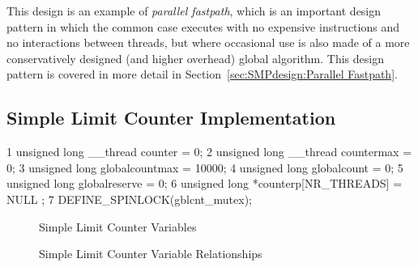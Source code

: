 This design is an example of \emph{parallel fastpath}, which is an important
design pattern in which the common case executes with no expensive
instructions and no interactions between threads, but where occasional
use is also made of a more conservatively designed
(and higher overhead) global algorithm.
This design pattern is covered in more detail in
Section~\ref{sec:SMPdesign:Parallel Fastpath}.

\subsection{Simple Limit Counter Implementation}
\label{sec:count:Simple Limit Counter Implementation}

{ \scriptsize
\begin{verbbox}
  1 unsigned long __thread counter = 0;
  2 unsigned long __thread countermax = 0;
  3 unsigned long globalcountmax = 10000;
  4 unsigned long globalcount = 0;
  5 unsigned long globalreserve = 0;
  6 unsigned long *counterp[NR_THREADS] = { NULL };
  7 DEFINE_SPINLOCK(gblcnt_mutex);
\end{verbbox}
}
\begin{figure}[tbp]
\centering
\theverbbox
\caption{Simple Limit Counter Variables}
\label{fig:count:Simple Limit Counter Variables}
\end{figure}

\begin{figure}[tb]
\begin{center}
\end{center}
\caption{Simple Limit Counter Variable Relationships}
\label{fig:count:Simple Limit Counter Variable Relationships}
\end{figure}

